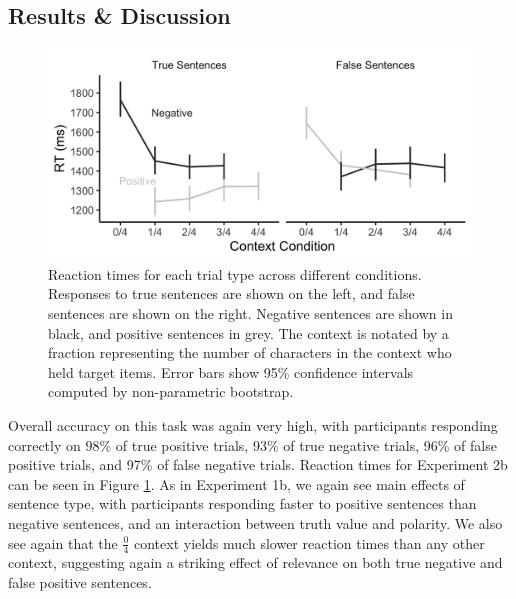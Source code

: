 \documentclass[man, floatsintext, noapacite]{apa6}
\begin{document}
\subsection{Results \& Discussion}

\begin{figure}[t]
\begin{center} 
\includegraphics[width=6in]{figures/experiment2/listener_rts.png}
\caption{\label{fig:exp2_listenerrt} Reaction times for each trial type across different conditions. Responses to true sentences are shown on the left, and false sentences are shown on the right.  Negative sentences are shown in black, and positive sentences in grey.  The context is notated by a fraction representing the number of characters in the context who held target items. Error bars show 95\% confidence intervals computed by non-parametric bootstrap.}
\end{center} 
\end{figure}

Overall accuracy on this task was again very high, with participants responding correctly on 98\% of true positive trials, 93\% of true negative trials, 96\% of false positive trials, and 97\% of false negative trials. Reaction times for Experiment 2b can be seen in Figure \ref{fig:exp2_listenerrt}. As in Experiment 1b, we again see main effects of sentence type, with participants responding faster to positive sentences than negative sentences, and an interaction between truth value and polarity. We also see again that the $\frac{0}{4}$ context yields much slower reaction times than any other context, suggesting again a striking effect of relevance on both true negative and false positive sentences. 
\end{document}
